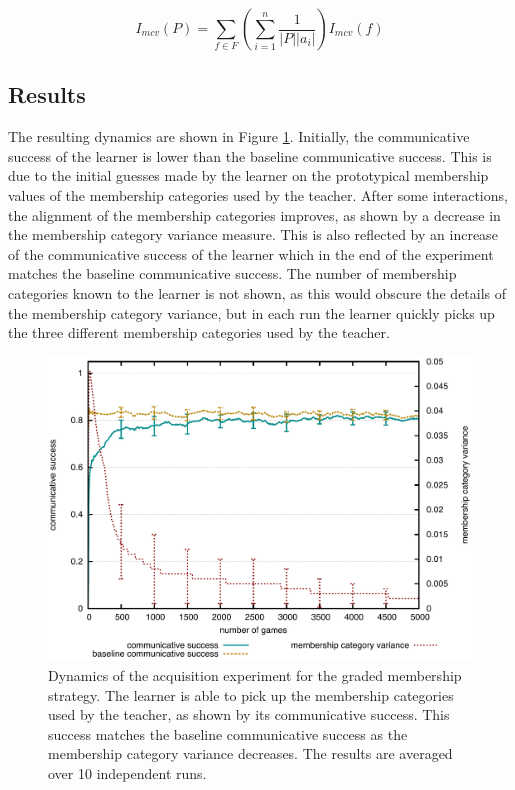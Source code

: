 \begin{equation}
  I_{mcv}(P) = \sum_{f \in F} \left(\sum_{i=1}^{n} \frac{1}{|P||a_i|}\right) I_{mcv}(f)
\label{eq:mcv-population}
\end{equation}

\subsection{Results}

The resulting dynamics are shown in Figure
\ref{f:gm-acquisition-dynamics}. Initially, the communicative success
of the learner is lower than the baseline communicative success. This is due to the
initial guesses made by the learner on the prototypical membership values of the 
membership categories used by the teacher. After some interactions, the
alignment of the membership categories improves, as shown by a
decrease in the membership category variance measure. This is
also reflected by an increase of the communicative success of the learner
which in the end of the experiment matches the baseline communicative
success. The number of membership categories known to the learner is
not shown, as this would obscure the details of the membership
category variance, but in each run the learner quickly picks up the three different
membership categories used by the teacher.

\begin{figure}[htpb]
  \begin{center}
    \includegraphics[width=.9\textwidth]{./graded-membership/figures/strict-acquisition.pdf}
    \caption[Dynamics of the acquisition experiment for the graded
    membership strategy]{Dynamics of the acquisition experiment for
      the graded membership strategy. The learner is able to pick up
      the membership categories used by the teacher, as shown by its
      communicative success. This success matches the baseline communicative
      success as the membership category variance decreases. The
      results are averaged over 10 independent runs.}
    \label{f:gm-acquisition-dynamics}
  \end{center}
\end{figure}

